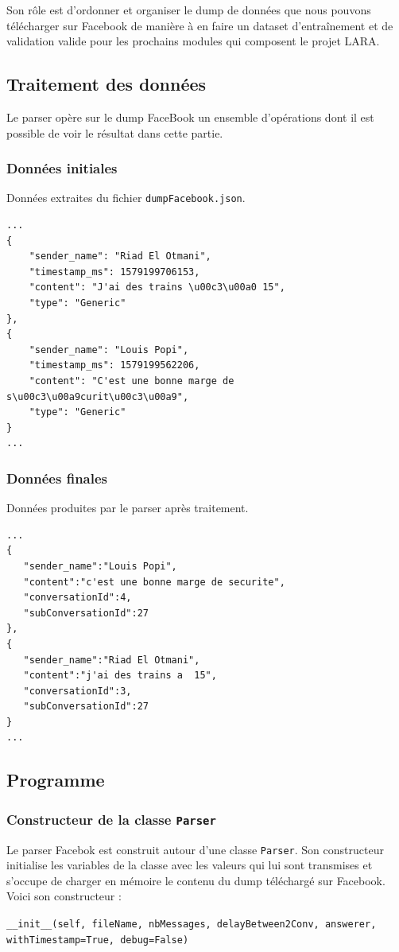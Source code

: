 \documentclass[10pt,a4paper]{article}
\begin{document}
Son rôle est d'ordonner et organiser le dump de données que nous pouvons télécharger sur Facebook de manière à en faire un dataset d'entraînement et de validation valide pour les prochains modules qui composent le projet LARA.

\subsection{Traitement des données}
Le parser opère sur le dump FaceBook un ensemble d'opérations dont il est possible de voir le résultat dans cette partie.

\subsubsection{Données initiales}
Données extraites du fichier \texttt{dumpFacebook.json}.
\begin{verbatim}
...
{
    "sender_name": "Riad El Otmani",
    "timestamp_ms": 1579199706153,
    "content": "J'ai des trains \u00c3\u00a0 15",
    "type": "Generic"
},
{
    "sender_name": "Louis Popi",
    "timestamp_ms": 1579199562206,
    "content": "C'est une bonne marge de s\u00c3\u00a9curit\u00c3\u00a9",
    "type": "Generic"
}
...
\end{verbatim}

\subsubsection{Données finales}
Données produites par le parser après traitement.
\begin{verbatim}
...
{
   "sender_name":"Louis Popi",
   "content":"c'est une bonne marge de securite",
   "conversationId":4,
   "subConversationId":27
},
{
   "sender_name":"Riad El Otmani",
   "content":"j'ai des trains a  15",
   "conversationId":3,
   "subConversationId":27
}
...
\end{verbatim}
\subsection{Programme}
\subsubsection{Constructeur de la classe \texttt{Parser}}
Le parser Facebok est construit autour d'une classe \texttt{Parser}. Son constructeur initialise les variables de la classe avec les valeurs qui lui sont transmises et s'occupe de charger en mémoire le contenu du dump téléchargé sur Facebook.  Voici son constructeur :
\begin{center}
	\texttt{\_\_init\_\_(self, fileName, nbMessages, delayBetween2Conv, answerer, withTimestamp=True, debug=False)}
\end{center}
\end{document}
